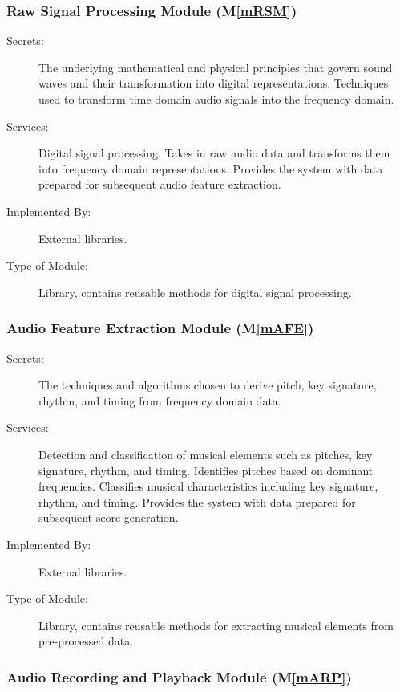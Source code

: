 \documentclass[12pt, titlepage]{article}
\newcommand{\mref}[1]{M\ref{#1}}
\begin{document}
\subsubsection{Raw Signal Processing Module (\mref{mRSM})}

\begin{description}
\item[Secrets:] The underlying mathematical and physical principles that govern sound waves and their transformation into digital representations.
  Techniques used to transform time domain audio signals into the frequency domain.
\item[Services:] Digital signal processing.
  Takes in raw audio data and transforms them into frequency domain representations.
  Provides the system with data prepared for subsequent audio feature extraction.
\item[Implemented By:] External libraries.
\item[Type of Module:] Library, contains reusable methods for digital signal processing.
\end{description}

\subsubsection{Audio Feature Extraction Module (\mref{mAFE})}

\begin{description}
\item[Secrets:] The techniques and algorithms chosen to derive pitch, key signature, rhythm, and timing from frequency domain data.
\item[Services:] Detection and classification of musical elements such as pitches, key signature, rhythm, and timing.
  Identifies pitches based on dominant frequencies.
  Classifies musical characteristics including key signature, rhythm, and timing.
  Provides the system with data prepared for subsequent score generation.
\item[Implemented By:] External libraries.
\item[Type of Module:] Library, contains reusable methods for extracting musical elements from pre-processed data.
\end{description}

\subsubsection{Audio Recording and Playback Module (\mref{mARP})}
\end{document}
